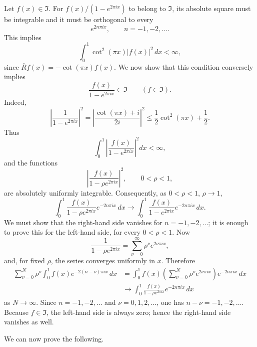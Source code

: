﻿\documentclass[paper=b5,fontsize=13pt,bookmarkpackage=false,twoside]{scrartcl}
\begin{document}
Let \(f(x)\in\mathfrak I\).  For
\(f(x)/(1-e^{2\pi ix})\) to belong to \(\mathfrak I\), its absolute
square must be integrable and it must be orthogonal to every
\[
  e^{2n\pi ix},\qquad n=-1,-2,\ldots.
\]
This implies
\[
  \int_0^1\cot^2(\pi x)|f(x)|^2\,dx<\infty,
\]
since \(\overline Rf(x)=-\cot(\pi x)f(x)\).  We now show that this
condition conversely implies
\[
  \frac{f(x)}{1-e^{2\pi ix}}\in\mathfrak I
  \qquad (f\in\mathfrak I).
\]
Indeed,
\[
 \left|\frac1{1-e^{2\pi ix}}\right|^2
 =\left|\frac{\cot(\pi x)+i}{2i}\right|^2
 \leq\frac12\cot^2(\pi x)+\frac12.
\]
Thus
\[
  \int_0^1
  \left|\frac{f(x)}{1-e^{2\pi ix}}\right|^2dx<\infty,
\]
and the functions
\[
  \left|\frac{f(x)}{1-\rho e^{2\pi ix}}\right|^2,
  \qquad 0<\rho<1,
\]
are absolutely uniformly integrable.  Consequently, as
\(0<\rho<1\), \(\rho\to1\),
\[
 \int_0^1
 \frac{f(x)}{1-\rho e^{2\pi ix}}e^{-2n\pi ix}\,dx
 \longrightarrow
 \int_0^1
 \frac{f(x)}{1-e^{2\pi ix}}e^{-2n\pi ix}\,dx.
\]
We must show that the right-hand side vanishes for
\(n=-1,-2,\ldots\); it is enough to prove this for the left-hand side,
for every \(0<\rho<1\).  Now
\[
  \frac1{1-\rho e^{2\pi ix}}
  =\sum_{\nu=0}^{\infty}\rho^\nu e^{2\nu\pi ix},
\]
and, for fixed \(\rho\), the series converges uniformly in \(x\).
Therefore
\begin{align*}
 \sum_{\nu=0}^{N}\rho^\nu
   \int_0^1 f(x)e^{-2(n-\nu)\pi ix}\,dx
 &=
 \int_0^1f(x)
    \left(\sum_{\nu=0}^{N}\rho^\nu e^{2\nu\pi ix}\right)
    e^{-2n\pi ix}\,dx\\
 &\longrightarrow
 \int_0^1\frac{f(x)}{1-\rho e^{2\pi ix}}
    e^{-2n\pi ix}\,dx
\end{align*}
as \(N\to\infty\).  Since \(n=-1,-2,\ldots\) and
\(\nu=0,1,2,\ldots\), one has \(n-\nu=-1,-2,\ldots\).  Because
\(f\in\mathfrak I\), the left-hand side is always zero; hence the
right-hand side vanishes as well.

We can now prove the following.
\end{document}
